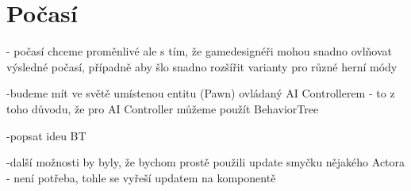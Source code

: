 
\section{Počasí}

- počasí chceme proměnlivé ale s tím, že gamedesignéři mohou snadno ovlňovat výsledné počasí, případně aby šlo snadno rozšířit varianty pro různé herní módy

-budeme mít ve světě umístenou entitu (Pawn) ovládaný AI Controllerem  - to z toho důvodu, že pro AI Controller můžeme použít BehaviorTree

-popsat ideu BT

-další možnosti by byly, že bychom prostě použili update smyčku nějakého Actora - není potřeba, tohle se vyřeší updatem na komponentě